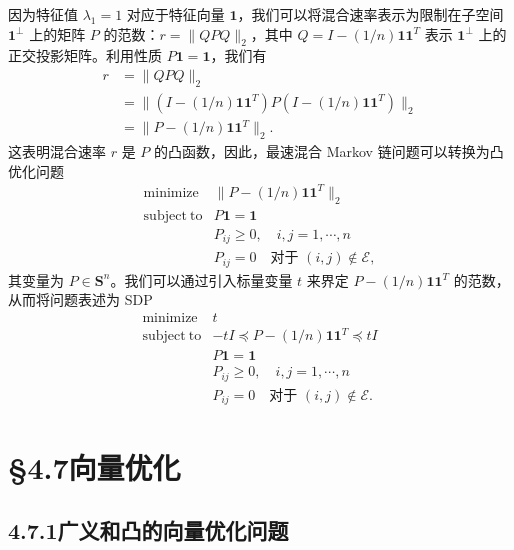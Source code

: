 \documentclass[UTF8, 12pt, fontset=fandol, oneside]{ctexart}
\begin{document}
因为特征值 $\lambda_1=1$ 对应于特征向量 $\mathbf{1}$，我们可以将混合速率表示为限制在子空间 $\mathbf{1}^{\perp}$ 上的矩阵 $P$ 的范数：$r=\|QPQ\|_2$，其中 $Q=I-(1/n)\mathbf{1}\mathbf{1}^T$ 表示 $\mathbf{1}^{\perp}$ 上的正交投影矩阵。利用性质 $P\mathbf{1}=\mathbf{1}$，我们有
\[
\begin{array}{rl}
r&=\|QPQ\|_2\\
&=\|(I-(1/n)\mathbf{1}\mathbf{1}^T)P(I-(1/n)\mathbf{1}\mathbf{1}^T)\|_2\\
&=\|P-(1/n)\mathbf{1}\mathbf{1}^T\|_2.
\end{array}
\]
这表明混合速率 $r$ 是 $P$ 的凸函数，因此，最速混合 Markov 链问题可以转换为凸优化问题
\[
\begin{array}{ll}
\mathop{\mathrm{minimize}} & \|P-(1/n)\mathbf{1}\mathbf{1}^T\|_2\\
\mathrm{subject\ to} & P\mathbf{1}=\mathbf{1}\\
& P_{ij}\geq 0,\quad i,j=1,\cdots,n\\
& P_{ij}=0\quad \text{对于 }(i,j)\notin\mathcal{E},
\end{array}
\]
其变量为 $P\in\mathbf{S}^n$。我们可以通过引入标量变量 $t$ 来界定 $P-(1/n)\mathbf{1}\mathbf{1}^T$ 的范数，从而将问题表述为 SDP
\begin{equation}
\begin{array}{ll}
\mathop{\mathrm{minimize}} & t\\
\mathrm{subject\ to} & -tI\preceq P-(1/n)\mathbf{1}\mathbf{1}^T\preceq tI\\
& P\mathbf{1}=\mathbf{1}\\
& P_{ij}\geq 0,\quad i,j=1,\cdots,n\\
& P_{ij}=0\quad \text{对于 }(i,j)\notin\mathcal{E}.
\end{array}
\tag{4.55}
\end{equation}

\section*{§4.7\quad 向量优化}

\subsection*{4.7.1\quad 广义和凸的向量优化问题}
\end{document}
